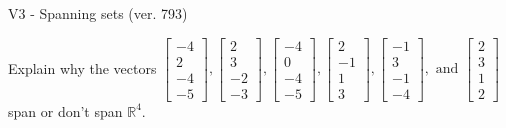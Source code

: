 \begin{exercise}
  \begin{exerciseTitle}V3 - Spanning sets (ver. 793)\end{exerciseTitle}
  \begin{exerciseStatement}
    Explain why the vectors \(\left[\begin{array}{r}
-4 \\
2 \\
-4 \\
-5
\end{array}\right] , \left[\begin{array}{r}
2 \\
3 \\
-2 \\
-3
\end{array}\right] , \left[\begin{array}{r}
-4 \\
0 \\
-4 \\
-5
\end{array}\right] , \left[\begin{array}{r}
2 \\
-1 \\
1 \\
3
\end{array}\right] , \left[\begin{array}{r}
-1 \\
3 \\
-1 \\
-4
\end{array}\right] , \text{ and } \left[\begin{array}{r}
2 \\
3 \\
1 \\
2
\end{array}\right]\) span or don't span \(\mathbb{R}^4\). 
	



\end{exerciseStatement}
\end{exercise}
